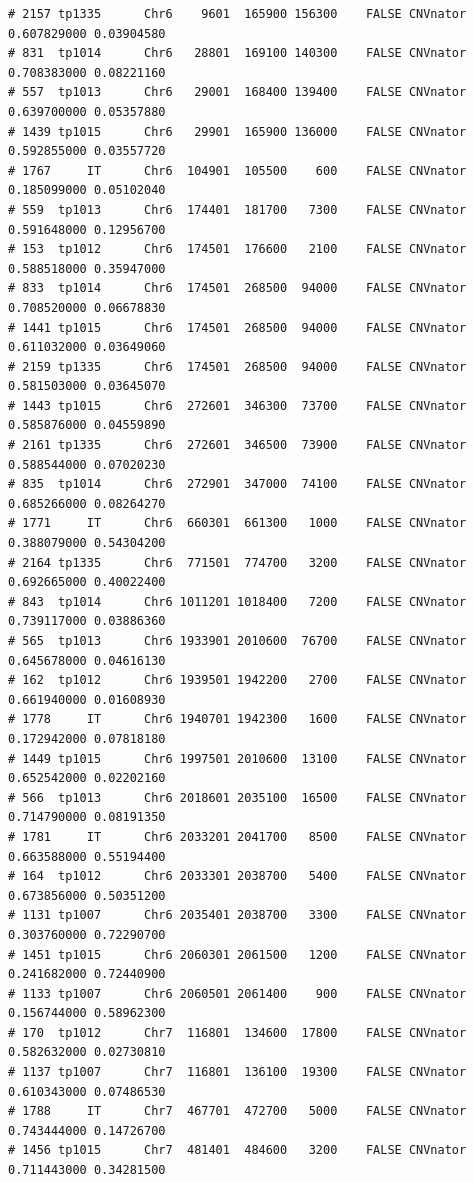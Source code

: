 \documentclass{article}\usepackage[]{graphicx}\usepackage[]{color}
\makeatletter
\newenvironment{kframe}{%
 \def\at@end@of@kframe{}%
 \ifinner\ifhmode%
  \def\at@end@of@kframe{\end{minipage}}%
  \begin{minipage}{\columnwidth}%
 \fi\fi%
 \def\FrameCommand##1{\hskip\@totalleftmargin \hskip-\fboxsep
 \colorbox{shadecolor}{##1}\hskip-\fboxsep
     \hskip-\linewidth \hskip-\@totalleftmargin \hskip\columnwidth}%
 \MakeFramed {\advance\hsize-\width
   \@totalleftmargin\z@ \linewidth\hsize
   \@setminipage}}%
 {\par\unskip\endMakeFramed%
 \at@end@of@kframe}
\newenvironment{knitrout}{}{} %
\makeatother
\begin{document}
\begin{knitrout}
\begin{kframe}
\begin{verbatim}
# 2157 tp1335      Chr6    9601  165900 156300    FALSE CNVnator 0.607829000 0.03904580
# 831  tp1014      Chr6   28801  169100 140300    FALSE CNVnator 0.708383000 0.08221160
# 557  tp1013      Chr6   29001  168400 139400    FALSE CNVnator 0.639700000 0.05357880
# 1439 tp1015      Chr6   29901  165900 136000    FALSE CNVnator 0.592855000 0.03557720
# 1767     IT      Chr6  104901  105500    600    FALSE CNVnator 0.185099000 0.05102040
# 559  tp1013      Chr6  174401  181700   7300    FALSE CNVnator 0.591648000 0.12956700
# 153  tp1012      Chr6  174501  176600   2100    FALSE CNVnator 0.588518000 0.35947000
# 833  tp1014      Chr6  174501  268500  94000    FALSE CNVnator 0.708520000 0.06678830
# 1441 tp1015      Chr6  174501  268500  94000    FALSE CNVnator 0.611032000 0.03649060
# 2159 tp1335      Chr6  174501  268500  94000    FALSE CNVnator 0.581503000 0.03645070
# 1443 tp1015      Chr6  272601  346300  73700    FALSE CNVnator 0.585876000 0.04559890
# 2161 tp1335      Chr6  272601  346500  73900    FALSE CNVnator 0.588544000 0.07020230
# 835  tp1014      Chr6  272901  347000  74100    FALSE CNVnator 0.685266000 0.08264270
# 1771     IT      Chr6  660301  661300   1000    FALSE CNVnator 0.388079000 0.54304200
# 2164 tp1335      Chr6  771501  774700   3200    FALSE CNVnator 0.692665000 0.40022400
# 843  tp1014      Chr6 1011201 1018400   7200    FALSE CNVnator 0.739117000 0.03886360
# 565  tp1013      Chr6 1933901 2010600  76700    FALSE CNVnator 0.645678000 0.04616130
# 162  tp1012      Chr6 1939501 1942200   2700    FALSE CNVnator 0.661940000 0.01608930
# 1778     IT      Chr6 1940701 1942300   1600    FALSE CNVnator 0.172942000 0.07818180
# 1449 tp1015      Chr6 1997501 2010600  13100    FALSE CNVnator 0.652542000 0.02202160
# 566  tp1013      Chr6 2018601 2035100  16500    FALSE CNVnator 0.714790000 0.08191350
# 1781     IT      Chr6 2033201 2041700   8500    FALSE CNVnator 0.663588000 0.55194400
# 164  tp1012      Chr6 2033301 2038700   5400    FALSE CNVnator 0.673856000 0.50351200
# 1131 tp1007      Chr6 2035401 2038700   3300    FALSE CNVnator 0.303760000 0.72290700
# 1451 tp1015      Chr6 2060301 2061500   1200    FALSE CNVnator 0.241682000 0.72440900
# 1133 tp1007      Chr6 2060501 2061400    900    FALSE CNVnator 0.156744000 0.58962300
# 170  tp1012      Chr7  116801  134600  17800    FALSE CNVnator 0.582632000 0.02730810
# 1137 tp1007      Chr7  116801  136100  19300    FALSE CNVnator 0.610343000 0.07486530
# 1788     IT      Chr7  467701  472700   5000    FALSE CNVnator 0.743444000 0.14726700
# 1456 tp1015      Chr7  481401  484600   3200    FALSE CNVnator 0.711443000 0.34281500

\end{verbatim}
\end{kframe}
\end{knitrout}
\end{document}
